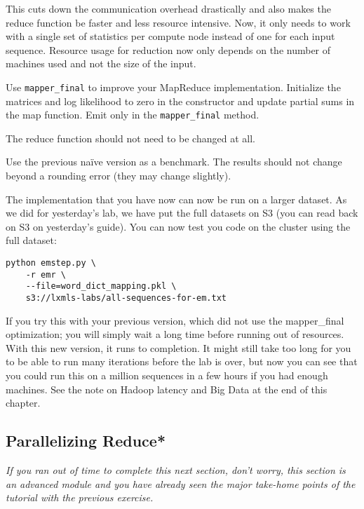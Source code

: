 This cuts down the communication overhead drastically and also makes the reduce
function be faster and less resource intensive. Now, it only needs to work with
a single set of statistics per compute node instead of one for each input
sequence. Resource usage for reduction now only depends on the number of
machines used and not the size of the input.

\begin{exercise}
Use \verb+mapper_final+ to improve your MapReduce implementation. Initialize the
matrices and log likelihood to zero in the constructor and update partial sums
in the map function. Emit only in the \verb+mapper_final+ method.

The reduce function should not need to be changed at all.

Use the previous naïve version as a benchmark. The results should not change
beyond a rounding error (they may change slightly).
\end{exercise}

The implementation that you have now can now be run on a larger dataset. As we
did for yesterday's lab, we have put the full datasets on S3 (you can read back
on S3 on yesterday's guide). You can now test you code on the cluster using the
full dataset:

\begin{verbatim}
python emstep.py \
    -r emr \
    --file=word_dict_mapping.pkl \
    s3://lxmls-labs/all-sequences-for-em.txt
\end{verbatim}

If you try this with your previous version, which did not use the mapper\_final
optimization; you will simply wait a long time before running out of
resources. With this new version, it runs to completion. It might still take
too long for you to be able to run many iterations before the lab is over, but
now you can see that you could run this on a million sequences in a few hours
if you had enough machines. See the note on Hadoop latency and Big Data at the
end of this chapter.

\subsection{Parallelizing Reduce*}

\emph{If you ran out of time to complete this next section, don't worry, this
section is an advanced module and you have already seen the major take-home
points of the tutorial with the previous exercise.}

